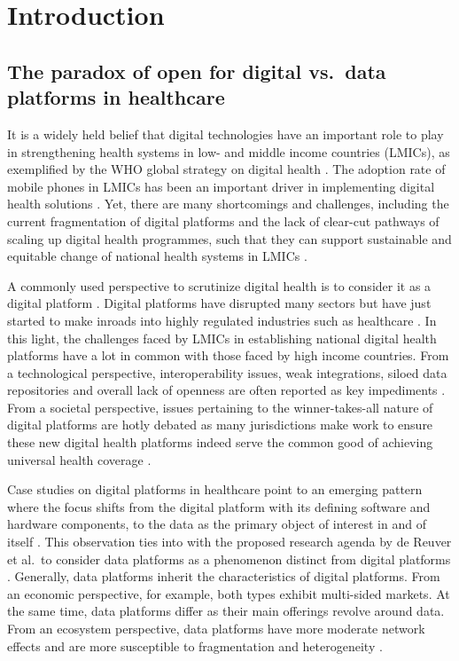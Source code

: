 \documentclass[
  authoryear]{elsarticle}
\begin{document}
\section{Introduction}\label{sec-intro}

\subsection{The paradox of open for digital vs.~data platforms in
healthcare}\label{the-paradox-of-open-for-digital-vs.-data-platforms-in-healthcare}

It is a widely held belief that digital technologies have an important
role to play in strengthening health systems in low- and middle income
countries (LMICs), as exemplified by the WHO global strategy on digital
health \citep{who2021global}. The adoption rate of mobile phones in
LMICs has been an important driver in implementing digital health
solutions \citep{mccool2022mobile}. Yet, there are many shortcomings and
challenges, including the current fragmentation of digital platforms and
the lack of clear-cut pathways of scaling up digital health programmes,
such that they can support sustainable and equitable change of national
health systems in LMICs
\citep{mehl2023fullstac, mccool2022mobile, who2019recommendations, neumark2021digital}.

A commonly used perspective to scrutinize digital health is to consider
it as a digital platform \citep{dereuver2018digital}. Digital platforms
have disrupted many sectors but have just started to make inroads into
highly regulated industries such as healthcare \citep{ozalp2022digital}.
In this light, the challenges faced by LMICs in establishing national
digital health platforms have a lot in common with those faced by high
income countries. From a technological perspective, interoperability
issues, weak integrations, siloed data repositories and overall lack of
openness are often reported as key impediments
\citep{malm-nicolais2023exploring, mehl2023fullstac}. From a societal
perspective, issues pertaining to the winner-takes-all nature of digital
platforms are hotly debated as many jurisdictions make work to ensure
these new digital health platforms indeed serve the common good of
achieving universal health coverage \citep{sharon2018when}.

Case studies on digital platforms in healthcare point to an emerging
pattern where the focus shifts from the digital platform with its
defining software and hardware components, to the data as the primary
object of interest in and of itself
\citep{ozalp2022digital, alaimo2022organizations}. This observation ties
into with the proposed research agenda by de Reuver et al.~to consider
data platforms as a phenomenon distinct from digital platforms
\citep{dereuver2022openness}. Generally, data platforms inherit the
characteristics of digital platforms. From an economic perspective, for
example, both types exhibit multi-sided markets. At the same time, data
platforms differ as their main offerings revolve around data. From an
ecosystem perspective, data platforms have more moderate network effects
and are more susceptible to fragmentation and heterogeneity
\citep{dereuver2022openness}.
\end{document}
